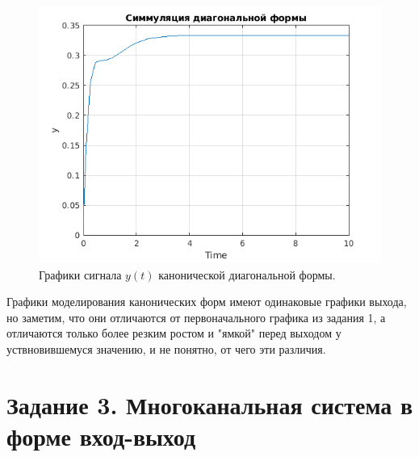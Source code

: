 \begin{enumerate}
\begin{figure}[htbp]
        \label{fig:task2_slx_diag}
    \end{figure}
    \begin{figure}[htbp]
        \centering
        \includegraphics[width=0.7\linewidth]{figs/task_2_out_diag_y.png}
        \caption{Графики сигнала $y(t)$ канонической диагональной формы.}
        \label{fig:task2_out_diag_y}
    \end{figure}
\end{enumerate}

Графики моделирования канонических форм имеют одинаковые графики выхода,
но заметим, что они отличаются от первоначального графика из задания 1,
а отличаются только более резким ростом и "ямкой" перед выходом
у уствновившемуся значению, и не понятно, от чего эти различия.



\section*{Задание 3. Многоканальная система в форме вход-выход}

